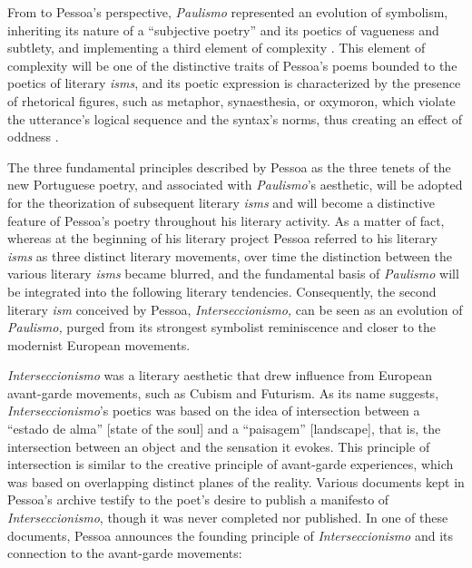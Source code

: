 \begin{paper}
\begin{quote}
\begin{flushright}
    \parencite[90]{pessoa_nova_1912}
\end{flushright} 
\end{quote}

\noindent From to Pessoa's perspective, \emph{Paulismo} represented an
evolution of symbolism, inheriting its nature of a ``subjective poetry''
and its poetics of vagueness and subtlety, and implementing a third
element of complexity \parencite[91]{pessoa_nova_1912}. This element of complexity will
be one of the distinctive traits of Pessoa's poems bounded to the
poetics of literary \emph{isms}, and its poetic expression is
characterized by the presence of rhetorical figures, such as metaphor,
synaesthesia, or oxymoron, which violate the utterance's logical
sequence and the syntax's norms, thus creating an effect of oddness \parencite[22]{morna_poesia_1982}.

The three fundamental principles described by Pessoa as the three tenets
of the new Portuguese poetry, and associated with \emph{Paulismo}'s
aesthetic, will be adopted for the theorization of subsequent literary
\emph{isms} and will become a distinctive feature of Pessoa's poetry
throughout his literary activity. As a matter of fact, whereas at the
beginning of his literary project Pessoa referred to his literary
\emph{isms} as three distinct literary movements, over time the
distinction between the various literary \emph{isms} became blurred, and
the fundamental basis of \emph{Paulismo} will be integrated into the
following literary tendencies. Consequently, the second literary
\emph{ism} conceived by Pessoa, \emph{Interseccionismo,} can be seen as
an evolution of \emph{Paulismo,} purged from its strongest symbolist
reminiscence and closer to the modernist European movements.

\emph{Interseccionismo} was a literary aesthetic that drew influence
from European avant-garde movements, such as Cubism and Futurism. As its
name suggests, \emph{Interseccionismo}'s poetics was based on the idea
of intersection between a ``estado de alma'' [state of the soul] and
a ``paisagem'' [landscape], that is, the intersection between an
object and the sensation it evokes. This principle of intersection is
similar to the creative principle of avant-garde experiences, which was
based on overlapping distinct planes of the reality. Various documents
kept in Pessoa's archive testify to the poet's desire to publish a
manifesto of \emph{Interseccionismo}, though it was never completed nor
published. In one of these documents, Pessoa announces the founding
principle of \emph{Interseccionismo} and its connection to the
avant-garde movements:


\end{paper}

